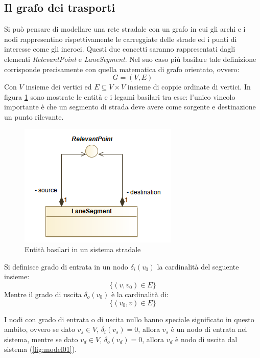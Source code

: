 \subsection{Il grafo dei trasporti}
Si può pensare di modellare una rete stradale con un grafo in cui gli archi e i nodi rappresentino rispettivamente le carreggiate delle strade ed i punti di interesse come gli incroci.
Questi due concetti saranno rappresentati dagli elementi \textit{RelevantPoint} e \textit{LaneSegment}.
Nel suo caso più basilare tale definizione corrisponde precisamente con quella matematica di grafo orientato, ovvero:
$$G = (V, E)$$
Con $V$ insieme dei vertici ed $E \subseteq V \times V$ insieme di coppie ordinate di vertici\cite{data_structures}.
In figura \ref{fig:model00} sono mostrate le entità e i legami basilari tra esse: l'unico vincolo importante è che un segmento di strada deve avere come sorgente e destinazione un punto rilevante.

\begin{figure}[h]
	\centering
	\includegraphics[scale=0.5]{img/model00}
	\caption{Entità basilari in un sistema stradale}
	\label{fig:model00}
\end{figure}

Si definisce grado di entrata in un nodo $\delta_i(v_0)$ la cardinalità del seguente insieme:
$$\{(v, v_0) \in E\}$$
Mentre il grado di uscita $\delta_o(v_0)$ è la cardinalità di:
$$\{(v_0, v) \in E\}$$

I nodi con grado di entrata o di uscita nullo hanno speciale significato in questo ambito, ovvero se dato $v_s \in V$, $\delta_i(v_s) = 0$, allora $v_s$ è un nodo di entrata nel sistema, mentre se dato $v_d \in V$, $\delta_o(v_d) = 0$, allora $v_d$ è nodo di uscita dal sistema (\ref{fig:model01}).

